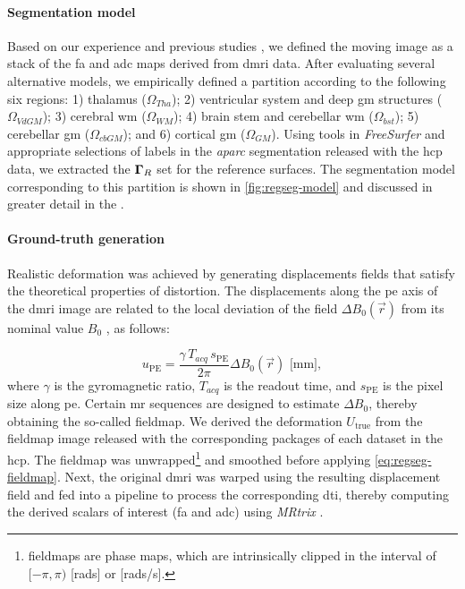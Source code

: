 \paragraph*{Segmentation model}
Based on our experience %
  and previous studies \citep{ennis_orthogonal_2006},
  we defined the moving image as a stack of the \gls*{fa} and \gls*{adc} maps derived
  from \gls*{dmri} data.
After evaluating several alternative models, we empirically defined a partition \omegaset{}
  according to the following six regions:
  1) thalamus ($\Omega_{Tha}$);
  2) ventricular system and deep \gls*{gm} structures ($\Omega_{VdGM}$);
  3) cerebral \gls*{wm} ($\Omega_{WM}$);
  4) brain stem and cerebellar \gls*{wm} ($\Omega_{bst}$);
  5) cerebellar \gls*{gm} ($\Omega_{cbGM}$); and
  6) cortical \gls*{gm} ($\Omega_{GM}$).
Using tools in \emph{FreeSurfer} and appropriate selections of labels in the
  \emph{aparc} segmentation released with the \gls*{hcp} data, we extracted the $\boldsymbol{\Gamma}_R$ set for the
  reference surfaces.
The segmentation model corresponding to this partition is shown in \autoref{fig:regseg-model}
  and discussed in greater detail in the .

\paragraph*{Ground-truth generation}
Realistic deformation was achieved by generating displacements fields that satisfy the theoretical
  properties of distortion.
The displacements along the \gls*{pe} axis of the \gls*{dmri} image are related to the local
  deviation of the field $\Delta B_0(\vec{r})$ from its nominal value $B_0$  \citep{jezzard_correction_1995},
  as follows:

  \begin{equation}
  u_\text{PE} = \frac{\gamma \, T_{acq}\, s_\text{PE}}{2\pi}\Delta B_0(\vec{r})\text{ [mm]},
  \label{eq:regseg-fieldmap}
  \end{equation}
where $\gamma$ is the gyromagnetic ratio, $T_{acq}$ is the readout time, and
  $s_\text{PE}$ is the pixel size along \gls*{pe}.
Certain \gls*{mr} sequences are designed to estimate $\Delta B_0$, thereby obtaining
  the so-called fieldmap.
We derived the deformation $U_\text{true}$ from the fieldmap image released with
  the corresponding packages of each dataset in the \gls*{hcp}.
The fieldmap was unwrapped\footnote{fieldmaps are phase maps, which are intrinsically clipped in the interval
  of $[-\pi, \pi)$ [rads] or [rads/s].} and smoothed before applying \eqref{eq:regseg-fieldmap}.
Next, the original \gls*{dmri} was warped using the resulting displacement field and fed into
  a pipeline to process the corresponding \gls*{dti}, thereby computing the derived scalars of
  interest (\gls*{fa} and \gls*{adc}) using \emph{MRtrix} \citep{tournier_mrtrix_2012}.

